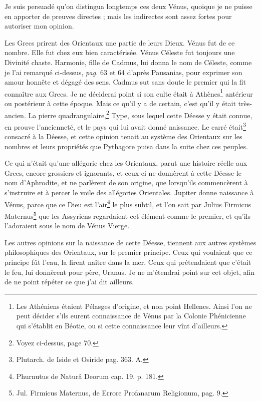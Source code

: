 \documentclass[a4paper, 11pt, oneside, polutonikogreek, french]{article}
\begin{document}
Je suis persuadé qu'on distingua longtemps ces deux Vénus, quoique je ne puisse en apporter de preuves directes ; mais les indirectes sont assez fortes pour autoriser mon opinion.

Les Grecs prirent des Orientaux une partie de leurs Dieux. Vénus fut de ce nombre. Elle fut chez eux bien caractérisée. Vénus Céleste fut toujours une Divinité chaste. Harmonie, fille de Cadmus, lui donna le nom de Céleste, comme je l'ai remarqué ci-dessus, \emph{pag.} 63 et 64 d'après Pausanias, pour exprimer son amour honnête et dégagé des sens. Cadmus sut sans doute le premier qui la fit connaître aux Grecs. Je ne déciderai point si son culte était à Athènes\footnote{Les Athéniens étaient Pélasges d'origine, et non point Hellenes. Ainsi l'on ne peut décider s'ils eurent connaissance de Vénus par la Colonie Phénicienne qui s'établit en Béotie, ou si cette connaissance leur vînt d'ailleurs.} antérieur ou postérieur à cette époque. Mais ce qu'il y a de certain, c'est qu'il y était très-ancien. La pierre quadrangulaire,\footnote{Voyez ci-dessus, page 70.} Type, sous lequel cette Déesse y était connue, en prouve l'ancienneté, et le pays qui lui avait donné naissance. Le carré était\footnote{Plutarch. de Iside et Osiride pag. 363. A.} consacré à la Déesse, et cette opinion tenait au système des Orientaux sur les nombres et leurs propriétés que Pythagore puisa dans la suite chez ces peuples.

Ce qui n'était qu'une allégorie chez les Orientaux, parut une histoire réelle aux Grecs, encore grossiers et ignorants, et ceux-ci ne donnèrent à cette Déesse le nom d'Aphrodite, et ne parlèrent de son origine, que lorsqu'ils commencèrent à s'instruire et à percer le voile des allégories Orientales. Jupiter donne naissance à Vénus, parce que ce Dieu est l'air\footnote{Phurnutus de Naturâ Deorum cap. 19. p. 181.} le plus subtil, et l'on sait par Julius Firmicus Maternus\footnote{Jul. Firmicus Maternus, de Errore Profanarum Religionum, pag. 9.} que les Assyriens regardaient cet élément comme le premier, et qu'ils l'adoraient sous le nom de Vénus Vierge.

Les autres opinions sur la naissance de cette Déesse, tiennent aux autres systèmes philosophiques des Orientaux, sur le premier principe. Ceux qui voulaient que ce principe fût l'eau, la firent naître dans la mer. Ceux qui prétendaient que c'était le feu, lui donnèrent pour père, Uranus. Je ne m'étendrai point sur cet objet, afin de ne point répéter ce que j'ai dit ailleurs.
\end{document}

